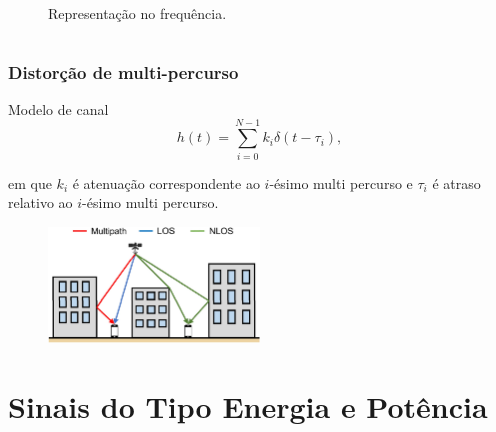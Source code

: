\documentclass[10pt,hyperref={pdfpagemode=FullScreen},aspectratio=169]{beamer}
\begin{document}
\begin{frame}
\begin{columns}
\begin{column}{0.45\textwidth}
\begin{figure}[!t]
\begin{center}
            \caption{Representação no frequência.}
          \end{center}
        \end{figure}


    \end{column}


  \end{columns}


\end{frame}


\begin{frame}
  \frametitle{ Distorção de multi-percurso}

  \begin{block}{Modelo de canal}
    $$
h(t) = \sum _{i=0}^{N-1}k_i \delta (t - \tau _i),
$$

em que $k_i$ é atenuação correspondente ao $i$-ésimo multi percurso e $\tau _i$ é atraso relativo ao $i$-ésimo multi percurso.

  \end{block}

  \begin{figure}[!h]
    \centering
    \includegraphics[width=0.5\textwidth]{Fig/multipath_channel.png}
  \end{figure}

\end{frame}

\section{Sinais do Tipo Energia e Potência}
\end{document}
